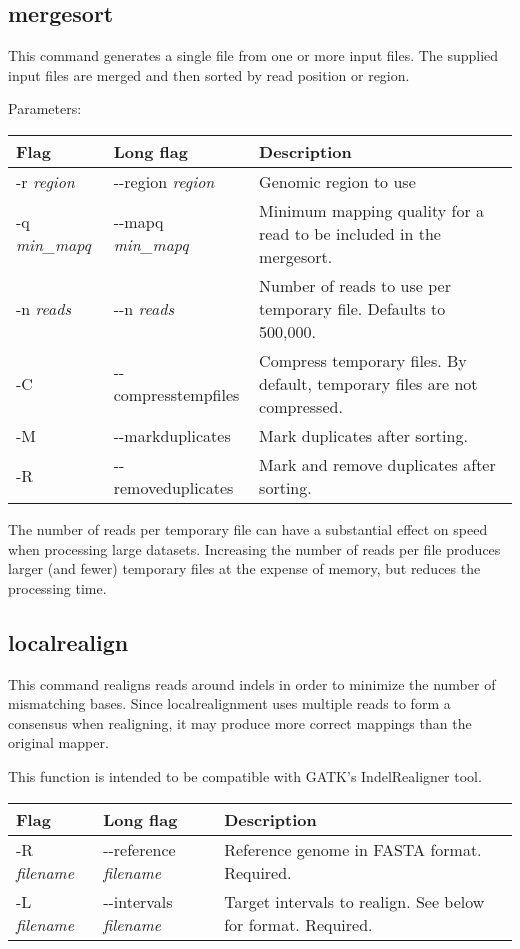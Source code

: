 \documentclass[11pt]{article}
\begin{document}
\subsection {mergesort}
This command generates a single file from one or more input files. The supplied input files are merged and then sorted by read position or region.

Parameters:
\begin{center}
\begin{tabular}{llp{3.5in}}
\hline
Flag&Long flag&Description\\ \hline
-r \textit{region}&{-}{-}region \textit{region}&Genomic region to use\\
-q \textit{min\_mapq}&{-}{-}mapq \textit{min\_mapq}&Minimum mapping quality for a read to be included in the mergesort.\\
-n \textit{reads}&{-}{-}n \textit{reads}&Number of reads to use per temporary file. Defaults to 500,000.\\
-C&{-}{-}compresstempfiles&Compress temporary files. By default, temporary files are not compressed.\\
-M&{-}{-}markduplicates&Mark duplicates after sorting.\\
-R&{-}{-}removeduplicates&Mark and remove duplicates after sorting.\\
\end{tabular}
\end{center}

The number of reads per temporary file can have a substantial effect on speed when processing large datasets. Increasing the number of reads per file produces larger (and fewer) temporary files at the expense of memory, but reduces the processing time.

\subsection {localrealign}
This command realigns reads around indels in order to minimize the number of mismatching bases. Since localrealignment uses multiple reads to form a consensus when realigning, it may produce more correct mappings than the original mapper.

This function is intended to be compatible with GATK's IndelRealigner tool.
\begin{center}
\begin{tabular}{llp{3.5in}}
\hline
Flag&Long flag&Description\\ \hline
-R \textit{filename}&{-}{-}reference \textit{filename}&Reference genome in FASTA format. Required.\\
-L \textit{filename}&{-}{-}intervals \textit{filename}&Target intervals to realign. See below for format. Required.\\
\end{tabular}
\end{center}
\end{document}
